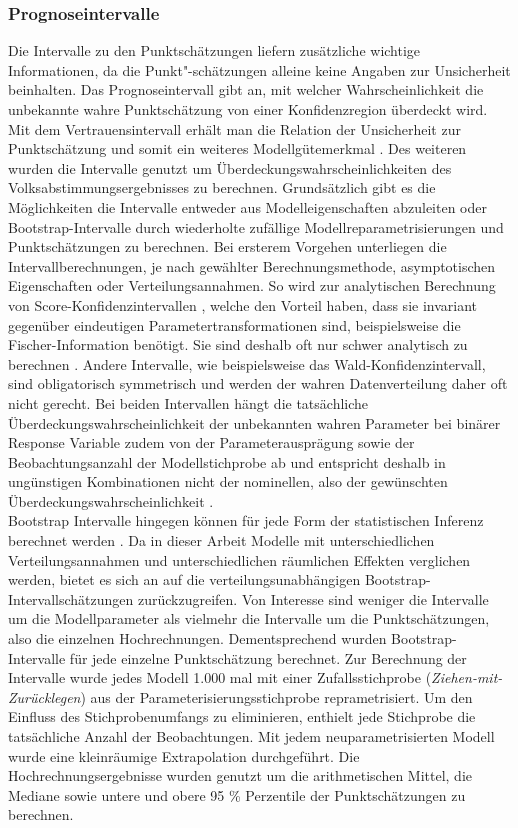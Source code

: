 \documentclass{Vorlage}
\begin{document}
\subsubsection{Prognoseintervalle}
Die Intervalle zu den Punktschätzungen liefern zusätzliche wichtige Informationen, da die Punkt"-schätzungen alleine keine Angaben zur Unsicherheit beinhalten. Das Prognoseintervall gibt an, mit welcher Wahrscheinlichkeit die unbekannte wahre Punktschätzung von einer Konfidenzregion überdeckt wird. Mit dem Vertrauensintervall erhält man die Relation der Unsicherheit zur Punktschätzung und somit ein weiteres Modellgütemerkmal \cite[p. 471]{fahrmeir2013regression}. Des weiteren wurden die Intervalle genutzt um Überdeckungswahrscheinlichkeiten des Volksabstimmungsergebnisses \cite{Amt} zu berechnen. Grundsätzlich gibt es die Möglichkeiten die Intervalle entweder aus Modelleigenschaften abzuleiten oder Bootstrap-Intervalle durch wiederholte zufällige Modellreparametrisierungen und Punktschätzungen zu berechnen. Bei ersterem Vorgehen unterliegen die Intervallberechnungen, je nach gewählter Berechnungsmethode, asymptotischen Eigenschaften oder Verteilungsannahmen. So wird zur analytischen Berechnung von Score-Konfidenzintervallen \cite[p. 64 ff.]{held2008}, welche den Vorteil haben, dass sie invariant gegenüber eindeutigen Parametertransformationen sind, beispielsweise die Fischer-Information benötigt. Sie sind deshalb oft nur schwer analytisch zu berechnen \cite[p. 74]{held2008}. Andere Intervalle, wie beispielsweise das Wald-Konfidenzintervall, sind obligatorisch symmetrisch \cite[p. 60]{held2008} und werden der wahren Datenverteilung daher oft nicht gerecht. Bei beiden Intervallen hängt die tatsächliche Überdeckungswahrscheinlichkeit der unbekannten wahren Parameter bei binärer Response Variable zudem von der Parameterausprägung sowie der Beobachtungsanzahl der Modellstichprobe ab und entspricht deshalb in ungünstigen Kombinationen nicht der nominellen, also der gewünschten Überdeckungswahrscheinlichkeit \cite{Int}. 
\\Bootstrap Intervalle hingegen können für jede Form der statistischen Inferenz berechnet werden \cite{diciccio1996}. Da in dieser Arbeit Modelle mit unterschiedlichen Verteilungsannahmen und unterschiedlichen räumlichen Effekten verglichen werden, bietet es sich an auf die verteilungsunabhängigen Bootstrap-Intervallschätzungen zurückzugreifen. Von Interesse sind weniger die Intervalle um die Modellparameter als vielmehr die Intervalle um die Punktschätzungen, also die einzelnen Hochrechnungen. Dementsprechend wurden Bootstrap-Intervalle für jede einzelne Punktschätzung berechnet. Zur Berechnung der Intervalle wurde jedes Modell 1.000 mal mit einer Zufallsstichprobe (\textit{Ziehen-mit-Zurücklegen}) aus der Parameterisierungsstichprobe reprametrisiert. Um den Einfluss des Stichprobenumfangs zu eliminieren, enthielt jede Stichprobe die tatsächliche Anzahl der Beobachtungen. Mit jedem neuparametrisierten Modell wurde eine kleinräumige Extrapolation durchgeführt. Die Hochrechnungsergebnisse wurden genutzt um die arithmetischen Mittel, die Mediane sowie untere und obere 95 \% Perzentile der Punktschätzungen zu berechnen.
\end{document}
